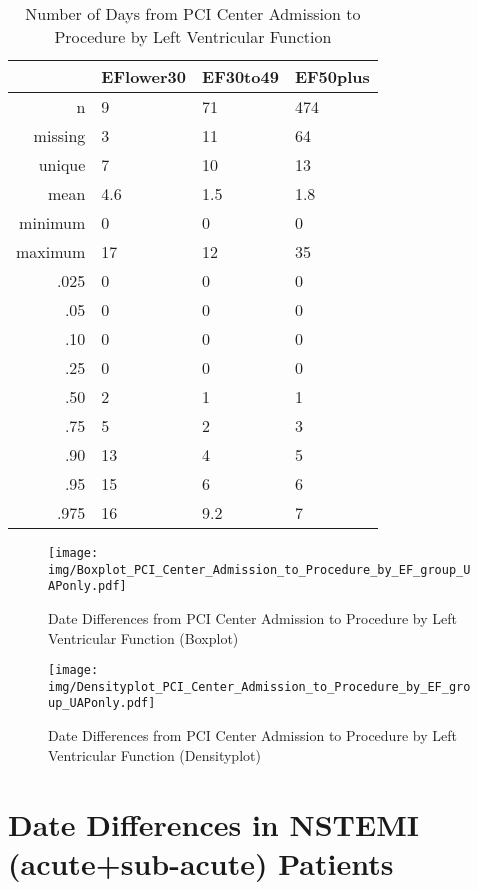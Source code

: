 \documentclass[a4paper]{report}
\begin{document}
\begin{itemize}
{%
\begin{table}[ht]
\centering
\begin{tabular}{rlll}
  \toprule
 & EFlower30 & EF30to49 & EF50plus \\ 
  \midrule
n & 9 & 71 & 474 \\ 
  missing & 3 & 11 & 64 \\ 
  unique & 7 & 10 & 13 \\ 
  mean & 4.6 & 1.5 & 1.8 \\ 
  minimum & 0 & 0 & 0 \\ 
  maximum & 17 & 12 & 35 \\ 
  .025 & 0 & 0 & 0 \\ 
  .05 & 0 & 0 & 0 \\ 
  .10 & 0 & 0 & 0 \\ 
  .25 & 0 & 0 & 0 \\ 
  .50 & 2 & 1 & 1 \\ 
  .75 & 5 & 2 & 3 \\ 
  .90 & 13 & 4 & 5 \\ 
  .95 & 15 & 6 & 6 \\ 
  .975 & 16 & 9.2 & 7 \\ 
   \bottomrule
\end{tabular}
\caption{Number of Days from PCI Center Admission to Procedure by Left Ventricular Function} 
\end{table}
\begin{figure}
  \centering
  \caption{Date Differences from PCI Center Admission to Procedure by Left Ventricular Function (Boxplot)}
  \label{Boxplot: Date Differences from PCI Center Admission to Procedure by Left Ventricular Function}
\texttt{[image: img/Boxplot\_PCI\_Center\_Admission\_to\_Procedure\_by\_EF\_group\_UAPonly.pdf]}\end{figure}


\begin{figure}
  \centering
  \caption{Date Differences from PCI Center Admission to Procedure by Left Ventricular Function (Densityplot)}
  \label{Density: Date Differences from PCI Center Admission to Procedure by Left Ventricular Function}
\texttt{[image: img/Densityplot\_PCI\_Center\_Admission\_to\_Procedure\_by\_EF\_group\_UAPonly.pdf]}\end{figure}




\clearpage
\section{Date Differences in NSTEMI (acute+sub-acute) Patients}

}
\end{itemize}
\end{document}
